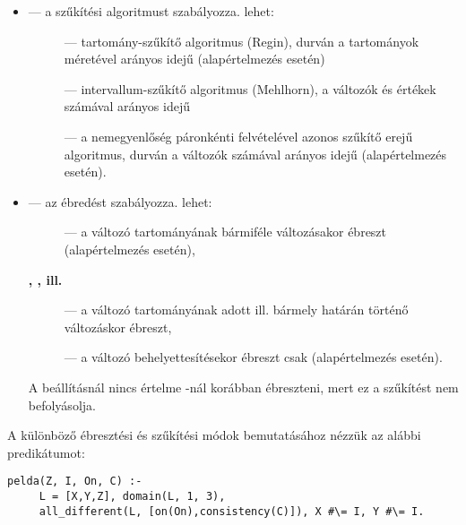 \begin{itemize}
\item {} --- a szűkítési algoritmust szabályozza.  lehet:
\begin{description}
\item[] --- tartomány-szűkítő algoritmus (Regin), durván a
tartományok méretével arányos idejű (alapértelmezés  esetén)
\item[] --- intervallum-szűkítő algoritmus (Mehlhorn), a
változók és értékek számával arányos idejű
\item[] --- a nemegyenlőség páronkénti felvételével azonos
szűkítő erejű algoritmus, durván a változók számával arányos idejű
(alapértelmezés  esetén).
\end{description}

\item {} --- az ébredést szabályozza.  lehet:
\begin{description}
\item[] --- a változó tartományának bármiféle változásakor
ébreszt (alapértelmezés  esetén),
\item[{\rm \bf {}, , {\rm ill.} }] ---
a változó tartományának adott ill. bármely határán történő változáskor ébreszt,
\item[] --- a változó behelyettesítésekor ébreszt csak (alapértelmezés
 esetén).
\end{description}

A  beállításnál nincs értelme -nál
korábban ébreszteni, mert ez a szűkítést nem befolyásolja.
\end{itemize}

A különböző ébresztési és szűkítési módok bemutatásához nézzük az alábbi predikátumot:

\begin{verbatim}
pelda(Z, I, On, C) :-
     L = [X,Y,Z], domain(L, 1, 3), 
     all_different(L, [on(On),consistency(C)]), X #\= I, Y #\= I.
\end{verbatim}

